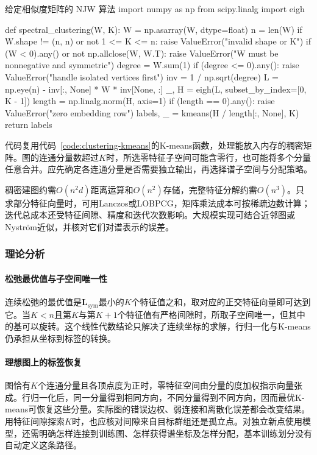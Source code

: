 \begin{codeblock}[language=Python,label={code:clustering-spectral}]{给定相似度矩阵的 NJW 算法}
import numpy as np
from scipy.linalg import eigh

def spectral_clustering(W, K):
    W = np.asarray(W, dtype=float)
    n = len(W)
    if W.shape != (n, n) or not 1 <= K <= n:
        raise ValueError("invalid shape or K")
    if (W < 0).any() or not np.allclose(W, W.T):
        raise ValueError("W must be nonnegative and symmetric")
    degree = W.sum(1)
    if (degree <= 0).any():
        raise ValueError("handle isolated vertices first")
    inv = 1 / np.sqrt(degree)
    L = np.eye(n) - inv[:, None] * W * inv[None, :]
    _, H = eigh(L, subset_by_index=[0, K - 1])
    length = np.linalg.norm(H, axis=1)
    if (length == 0).any():
        raise ValueError("zero embedding row")
    labels, _ = kmeans(H / length[:, None], K)
    return labels
\end{codeblock}

代码复用代码~\ref{code:clustering-kmeans}的K-means函数，处理能放入内存的稠密矩阵。图的连通分量数超过$K$时，所选零特征子空间可能含零行，也可能将多个分量任意合并。应先确定各连通分量是否需要独立输出，再选择谱子空间与分配策略。

稠密建图约需$O(n^2d)$距离运算和$O(n^2)$存储，完整特征分解约需$O(n^3)$。只求部分特征向量时，可用Lanczos或LOBPCG，矩阵乘法成本可按稀疏边数计算；迭代总成本还受特征间隙、精度和迭代次数影响。大规模实现可结合近邻图或Nyström近似，并核对它们对谱表示的误差。

\subsubsection{理论分析}

\paragraph{松弛最优值与子空间唯一性}

连续松弛的最优值是$\bm L_{\mathrm{sym}}$最小的$K$个特征值之和，取对应的正交特征向量即可达到它。当$K<n$且第$K$与第$K+1$个特征值有严格间隙时，所取子空间唯一，但其中的基可以旋转。这个线性代数结论只解决了连续坐标的求解，行归一化与K-means仍承担从坐标到标签的转换。

\paragraph{理想图上的标签恢复}

图恰有$K$个连通分量且各顶点度为正时，零特征空间由分量的度加权指示向量张成。行归一化后，同一分量得到相同方向，不同分量得到不同方向，因而最优K-means可恢复这些分量。实际图的错误边权、弱连接和离散化误差都会改变结果。用特征间隙探索$K$时，也应核对间隙来自目标群组还是孤立点。对独立新点使用模型，还需明确怎样连接到训练图、怎样获得谱坐标及怎样分配，基本训练划分没有自动定义这条路径。
